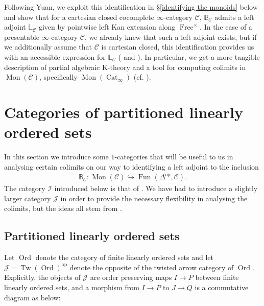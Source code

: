 \documentclass[12pt, reqno]{amsart}
\theoremstyle{plain}
\theoremstyle{definition}
\begin{document}
Following Yuan, we exploit this identification in \S \ref{identifying the monoids} below and show that for a cartesian closed cocomplete $\infty$-category $\mathcal{C}$, $\mathbb{B}_\mathcal{C}$ admits a left adjoint $\mathbb{L}_\mathcal{C}$ given by pointwise left Kan extension along $\operatorname{Free}^\times$. In the case of a presentable $\infty$-category $\mathcal{C}$, we already knew that such a left adjoint exists, but if we additionally assume that $\mathcal{C}$ is cartesian closed, this identification provides us with an accessible expression for $\mathbb{L}_\mathcal{C}$ ( and ). In particular, we get a more tangible description of partial algebraic K-theory and a tool for computing colimits in $\operatorname{Mon}(\mathcal{C})$, specifically $\operatorname{Mon}(\operatorname{Cat}_\infty)$ (cf. ).


\section{Categories of partitioned linearly ordered sets}\label{partitioned linearly ordered sets}

In this section we introduce some $1$-categories that will be useful to us in analysing certain colimits on our way to identifying a left adjoint to the inclusion
\begin{align*}
\mathbb{B}_\mathcal{C}\colon \operatorname{Mon}(\mathcal{C})\hookrightarrow \operatorname{Fun}(\Delta^{\operatorname{op}},\mathcal{C}).
\end{align*}
The category $\mathcal{I}$ introduced below is that of \cite[Definition 5.8]{Yuan}. We have had to introduce a slightly larger category $\mathcal{J}$ in order to provide the necessary flexibility in analysing the colimits, but the ideas all stem from \cite{Yuan}.

\subsection{Partitioned linearly ordered sets}

Let $\operatorname{Ord}$ denote the category of finite linearly ordered sets and let $\mathcal{J}=\operatorname{Tw}(\operatorname{Ord})^{\operatorname{op}}$ denote the opposite of the twisted arrow category of $\operatorname{Ord}$. Explicitly, the objects of $\mathcal{J}$ are order preserving maps $I\rightarrow P$ between finite linearly ordered sets, and a morphism from $I\rightarrow P$ to $J\rightarrow Q$ is a commutative diagram as below:
\begin{center}
\end{center}
\end{document}
